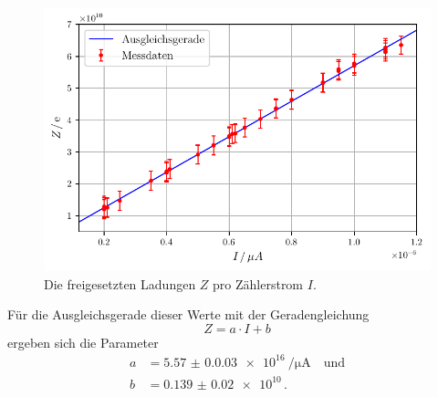 \begin{figure}[H]
    \centering
    \includegraphics[width = 0.9\linewidth]{build/plot2.pdf}
    \caption{Die freigesetzten Ladungen $Z$ pro Zählerstrom $I$.}
    \label{fig:plot2}
\end{figure}
Für die Ausgleichsgerade dieser Werte mit der Geradengleichung
\begin{equation*}
    Z = a \cdot I + b 
\end{equation*}
ergeben sich die Parameter
\begin{align*}
    a &= \qty{5.57(0.003)e16}{\per\micro\ampere} \quad \text{und} \\
    b &= \num{0.139(20)e10} \, .
\end{align*}